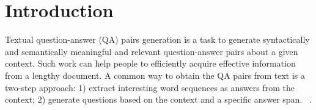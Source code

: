 \section{Introduction}
\label{sec:intro}

Textual question-answer (QA) pairs generation is a task to generate 
syntactically and semantically meaningful and relevant question-answer 
pairs about a given context. 
Such work can help people to 
efficiently acquire effective information from a lengthy document.
A common way to obtain the QA pairs from text is a two-step approach: 
1) extract interesting word sequences as answers from the context;
2) generate questions based on the context and a specific answer span.
~\cite{subramanian2017neural,lovenia2018automatic,kumar2019paraqg,DBLP:journals/corr/abs-1906-02622}.



